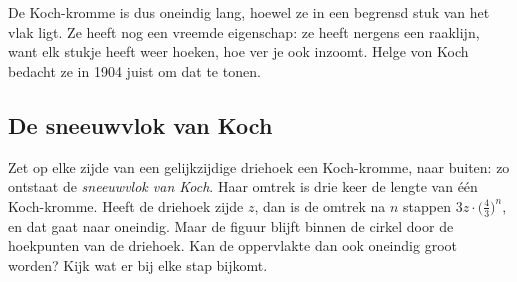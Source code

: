 De Koch-kromme is dus oneindig lang, hoewel ze in een begrensd stuk van het vlak ligt. Ze heeft nog een vreemde eigenschap: ze heeft nergens een raaklijn, want elk stukje heeft weer hoeken, hoe ver je ook inzoomt. Helge von Koch bedacht ze in 1904 juist om dat te tonen.


\begin{oefeningen}
\end{oefeningen}

\subsection{De sneeuwvlok van Koch}

Zet op elke zijde van een gelijkzijdige driehoek een Koch-kromme, naar buiten: zo ontstaat de \emph{sneeuwvlok van Koch}. Haar omtrek is drie keer de lengte van één Koch-kromme. Heeft de driehoek zijde $z$, dan is de omtrek na $n$ stappen $3z \cdot \bigl(\tfrac43\bigr)^n$, en dat gaat naar oneindig. Maar de figuur blijft binnen de cirkel door de hoekpunten van de driehoek. Kan de oppervlakte dan ook oneindig groot worden? Kijk wat er bij elke stap bijkomt.

